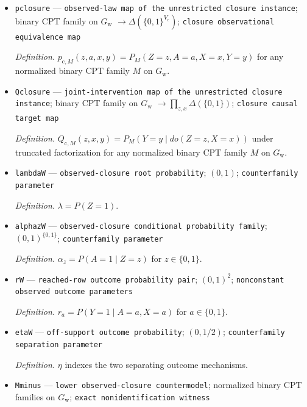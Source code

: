 \documentclass{article}
\begin{document}
\begin{itemize}
  \par\smallskip\noindent\emph{Definition.} \(\mathfrak M_{\mathrm c}=\mathfrak M(G_{\mathrm w},\mathcal A_{\mathrm w},V_{\mathrm c},W_{\mathrm c},T_{\mathrm c})\) with outcome set \(Y_{\mathrm c}\).
  \item \texttt{pclosure} --- \texttt{observed-\allowbreak{}law map of the unrestricted closure instance}; binary CPT family on \(G_{\mathrm w}\) \(\to\Delta(\{0,1\}^{V_{\mathrm c}})\); \texttt{closure observational equivalence map}
  \par\smallskip\noindent\emph{Definition.} \(p_{\mathrm c,M}(z,a,x,y)=P_M(Z=z,A=a,X=x,Y=y)\) for any normalized binary CPT family \(M\) on \(G_{\mathrm w}\).
  \item \texttt{Qclosure} --- \texttt{joint-\allowbreak{}intervention map of the unrestricted closure instance}; binary CPT family on \(G_{\mathrm w}\) \(\to\prod_{z,x}\Delta(\{0,1\})\); \texttt{closure causal target map}
  \par\smallskip\noindent\emph{Definition.} \(Q_{\mathrm c,M}(z,x,y)=P_M(Y=y\mid do(Z=z,X=x))\) under truncated factorization for any normalized binary CPT family \(M\) on \(G_{\mathrm w}\).
  \item \texttt{lambdaW} --- \texttt{observed-\allowbreak{}closure root probability}; \((0,1)\); \texttt{counterfamily parameter}
  \par\smallskip\noindent\emph{Definition.} \(\lambda=P(Z=1)\).
  \item \texttt{alphazW} --- \texttt{observed-\allowbreak{}closure conditional probability family}; \((0,1)^{\{0,1\}}\); \texttt{counterfamily parameter}
  \par\smallskip\noindent\emph{Definition.} \(\alpha_z=P(A=1\mid Z=z)\) for \(z\in\{0,1\}\).
  \item \texttt{rW} --- \texttt{reached-\allowbreak{}row outcome probability pair}; \((0,1)^2\); \texttt{nonconstant observed outcome parameters}
  \par\smallskip\noindent\emph{Definition.} \(r_a=P(Y=1\mid A=a,X=a)\) for \(a\in\{0,1\}\).
  \item \texttt{etaW} --- \texttt{off-\allowbreak{}support outcome probability}; \((0,1/2)\); \texttt{counterfamily separation parameter}
  \par\smallskip\noindent\emph{Definition.} \(\eta\) indexes the two separating outcome mechanisms.
  \item \texttt{Mminus} --- \texttt{lower observed-\allowbreak{}closure countermodel}; normalized binary CPT families on \(G_{\mathrm w}\); \texttt{exact nonidentification witness}

\end{itemize}
\end{document}
